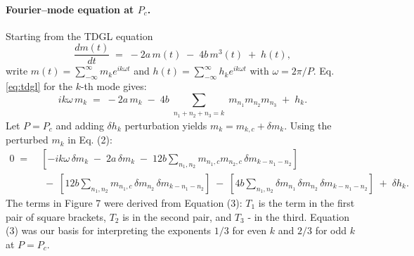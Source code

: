 \documentclass{article}
\begin{document}
\paragraph{Fourier–mode equation at $P_c$.}
Starting from the TDGL equation
\begin{equation}
  \frac{d m(t)}{dt} \;=\; -2a\,m(t)\;-\;4b\,m^3(t)\;+\;h(t),
  \label{eq:tdgl}
\end{equation}
write $m(t)=\sum_{-\infty}^\infty m_k e^{ik\omega t}$ and $h(t)=\sum_{-\infty}^\infty h_k e^{ik\omega t}$ with $\omega=2\pi/P$.
Eq. \eqref{eq:tdgl} for the $k$-th mode gives:
\begin{equation}
  ik\omega\, m_k \;=\; -2a\,m_k \;-\; 4b \!\!\sum_{\substack{n_1+n_2+n_3=k}}\! m_{n_1} m_{n_2} m_{n_3} \;+\; h_k .
  \label{eq:mode_exact}
\end{equation}
Let $P=P_c$ and adding $\delta h_k$ perturbation yields $m_k=m_{k,c}+\delta m_k$. Using the perturbed $m_k$ in Eq. (2): 
\begin{align}
  0 \;=\;& [-ik\omega\,\delta m_k \;-\; 2a\,\delta m_k
  \;-\; 12b \!\!\sum_{n_1,n_2} m_{n_1,c} m_{n_2,c}\,\delta m_{k-n_1-n_2}
  \nonumber]\\
  &\;-\; [12b \!\!\sum_{n_1,n_2} m_{n_1,c}\,\delta m_{n_2}\,\delta m_{k-n_1-n_2}]
  \;-\; [4b \!\!\sum_{n_1,n_2} \delta m_{n_1}\,\delta m_{n_2}\,\delta m_{k-n_1-n_2}]
  \;+\; \delta h_k .
  \label{eq:mode_perturb}
\end{align}
The terms in Figure 7 were derived from Equation (3): $T_1$ is the term in the first pair of square brackets, $T_2$ is in the second pair, and $T_3$ - in the third.
Equation (3) was our basis for interpreting the exponents $1/3$ for even $k$ and $2/3$ for odd $k$ at $P=P_c$.
\end{document}

